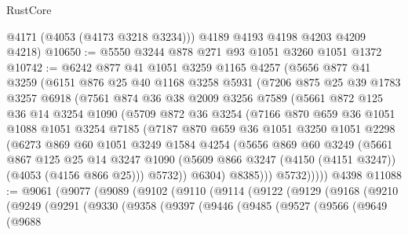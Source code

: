 \begin{lexlean}{RustCore}
\begin{coremodule}
        @4171
        (@4053 (@4173 @3218 @3234)))
      @4189
      @4193
      @4198
      @4203
      @4209
      @4218)
@10650 := @5550 @3244 @878 @271 @93 @1051 @3260 @1051 @1372
@10742 := @6242
    @877
    @41
    @1051
    @3259
    @1165
    @4257
    (@5656
      @877
      @41
      @3259
      (@6151
        @876
        @25
        @40
        @1168
        @3258
        @5931
        (@7206
          @875
          @25
          @39
          @1783
          @3257
          @6918
          (@7561
            @874
            @36
            @38
            @2009
            @3256
            @7589
            (@5661
              @872
              @125
              @36
              @14
              @3254
              @1090
              (@5709
                @872
                @36
                @3254
                (@7166
                  @870
                  @659
                  @36
                  @1051
                  @1088
                  @1051
                  @3254
                  @7185
                  (@7187
                    @870
                    @659
                    @36
                    @1051
                    @3250
                    @1051
                    @2298
                    (@6273
                      @869
                      @60
                      @1051
                      @3249
                      @1584
                      @4254
                      (@5656
                        @869
                        @60
                        @3249
                        (@5661
                          @867
                          @125
                          @25
                          @14
                          @3247
                          @1090
                          (@5609 @866 @3247 (@4150 (@4151 @3247)) (@4053 (@4156 @866 @25)))
                          @5732))
                      @6304)
                    @8385)))
              @5732)))))
    @4398
@11088 := @9061
    (@9077
      (@9089
        (@9102
          (@9110
            (@9114
              (@9122
                (@9129
                  (@9168
                    (@9210
                      (@9249
                        (@9291
                          (@9330
                            (@9358
                              (@9397
                                (@9446
                                  (@9485
                                    (@9527
                                      (@9566
                                        (@9649
                                          (@9688

\end{coremodule}
\end{lexlean}
